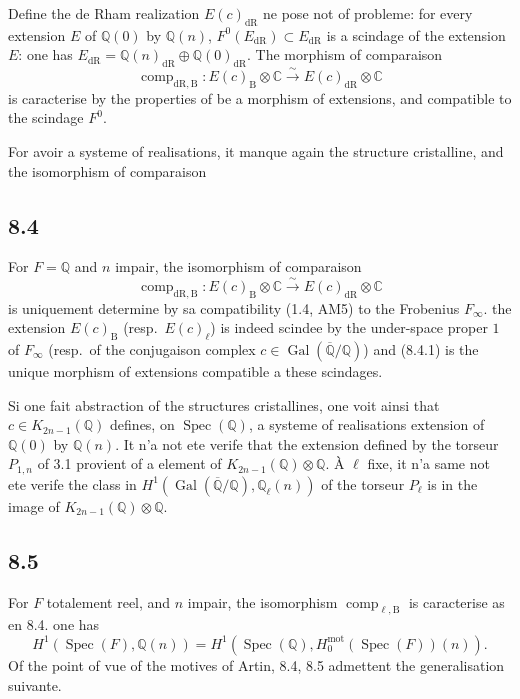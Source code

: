 \documentclass[12pt,a4paper]{article}
\theoremstyle{plain}
\theoremstyle{definition}
\theoremstyle{remark}
\DeclareMathOperator{\Spec}{Spec}
\DeclareMathOperator{\Gal}{Gal}
\DeclareMathOperator{\comp}{comp}
\newcommand{\DR}{\mathrm{dR}}
\newcommand{\B}{\mathrm{B}}
\newcommand{\mot}{\mathrm{mot}}
\newcommand{\Q}{\mathbb{Q}}
\newcommand{\C}{\mathbb{C}}
\begin{document}
Define the de Rham realization $E(c)_\DR$ ne pose not of probleme: for every extension $E$ of $\Q(0)$ by $\Q(n)$, $F^0(E_\DR) \subset E_\DR$ is a scindage of the extension $E$: one has $E_\DR = \Q(n)_\DR \oplus \Q(0)_\DR$. The morphism of comparaison
\begin{equation*}\tag{8.3.1}
\comp_{\DR,\B}: E(c)_\B \otimes \C \xrightarrow{\sim} E(c)_\DR \otimes \C
\end{equation*}
is caracterise by the properties of be a morphism of extensions, and compatible to the scindage $F^0$.

For avoir a systeme of realisations, it manque again the structure cristalline, and the isomorphism of comparaison

\subsection*{8.4}
For $F = \Q$ and $n$ impair, the isomorphism of comparaison
\begin{equation*}\tag{8.4.1}
\comp_{\DR,\B}: E(c)_\B \otimes \C \xrightarrow{\sim} E(c)_\DR \otimes \C
\end{equation*}
is uniquement determine by sa compatibility (1.4, AM5) to the Frobenius $F_\infty$. the extension $E(c)_\B$ (resp.~$E(c)_\ell$) is indeed scindee by the under-space proper $1$ of $F_\infty$ (resp.~of the conjugaison complex $c \in \Gal(\overline{\Q}/\Q)$) and (8.4.1) is the unique morphism of extensions compatible a these scindages.

Si one fait abstraction of the structures cristallines, one voit ainsi that $c \in K_{2n-1}(\Q)$ defines, on $\Spec(\Q)$, a systeme of realisations extension of $\Q(0)$ by $\Q(n)$. It n'a not ete verife that the extension defined by the torseur $P_{1,n}$ of 3.1 provient of a element of $K_{2n-1}(\Q) \otimes \Q$. \`A $\ell$ fixe, it n'a same not ete verife the class in $H^1(\Gal(\overline{\Q}/\Q), \Q_\ell(n))$ of the torseur $P_\ell$ is in the image of $K_{2n-1}(\Q) \otimes \Q$.

\subsection*{8.5}
For $F$ totalement reel, and $n$ impair, the isomorphism $\comp_{\ell,\B}$ is caracterise as en 8.4. one has
\begin{equation*}\tag{8.5.1}
H^1(\Spec(F), \Q(n)) = H^1(\Spec(\Q), H^{\mot}_0(\Spec(F))(n)).
\end{equation*}
Of the point of vue of the motives of Artin, 8.4, 8.5 admettent the generalisation suivante.
\end{document}
